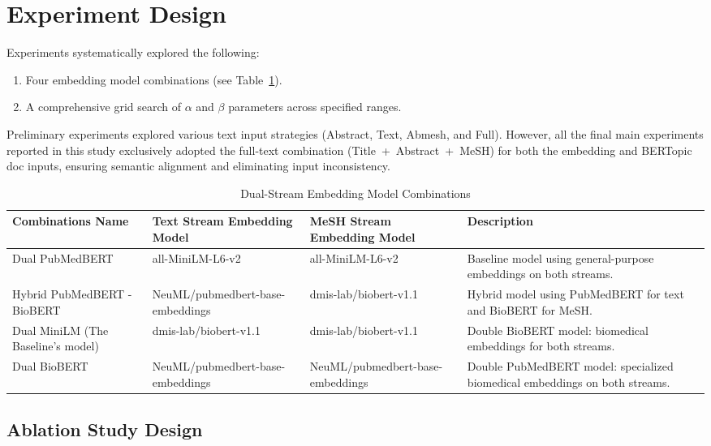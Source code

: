 \documentclass{ieeeaccess}
\begin{document}
\section{Experiment Design}
Experiments systematically explored the following:
\begin{enumerate}[leftmargin=*,label=\arabic*)]
    \item Four embedding model combinations (see Table~\ref{tab:model_combinations}).
    \item A comprehensive grid search of $\alpha$ and $\beta$ parameters across specified ranges.
\end{enumerate}

Preliminary experiments explored various text input strategies (Abstract, Text, Abmesh, and Full). However, all the final main experiments reported in this study exclusively adopted the full-text combination (Title~+~Abstract~+~MeSH) for both the embedding and BERTopic doc inputs, ensuring semantic alignment and eliminating input inconsistency.
\begin{table}[!ht]
\caption{Dual-Stream Embedding Model Combinations}
\label{tab:model_combinations}
\centering
\renewcommand{\arraystretch}{1.3}
\begin{tabular}{p{3.2cm}p{4.2cm}p{4cm}p{4.8cm}}
\hline
\textbf{Combinations Name} & \textbf{Text Stream Embedding Model} & \textbf{MeSH Stream Embedding Model} & \textbf{Description} \\
\hline
Dual PubMedBERT & all-MiniLM-L6-v2 & all-MiniLM-L6-v2 & Baseline model using general-purpose embeddings on both streams. \\
\hline
Hybrid PubMedBERT - BioBERT & NeuML/pubmedbert-base-embeddings & dmis-lab/biobert-v1.1 & Hybrid model using PubMedBERT for text and BioBERT for MeSH. \\
\hline
Dual MiniLM (The Baseline's model) & dmis-lab/biobert-v1.1 & dmis-lab/biobert-v1.1 & Double BioBERT model: biomedical embeddings for both streams. \\
\hline
Dual BioBERT & NeuML/pubmedbert-base-embeddings & NeuML/pubmedbert-base-embeddings & Double PubMedBERT model: specialized biomedical embeddings on both streams. \\
\hline
\end{tabular}
\end{table}

\subsection{Ablation Study Design}
\end{document}
